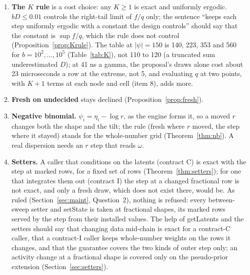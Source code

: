 \begin{enumerate}
\begin{itemize}
design's binomial and negative binomial cells lie (the scripts' counts give about 250 to 400); if it fails, the step
has no case at whole-number shapes, and S1 goes back to the maintainer before S2. Fractional shapes have no sum to
fall back on and keep the route whatever it costs: no inexact fallback is introduced. If $c_R$ there exceeds a
budget of ten times the design's figure, 70\,$\mu$s a row step, S1 reports the cells that exceed it (in the
scripts: $|\psi|\ge50$) for the documentation of real weights.
\end{itemize}
\item \textbf{The $K$ rule} is a cost choice: any $K\ge1$ is exact and uniformly ergodic. $bD\le0.01$ controls
the right-tail limit of $f/q$ only; the sentence ``keeps each step uniformly ergodic with a constant the design
controls'' should say that the constant is $\sup f/q$, which the rule does not control
(Proposition~\ref{prop:Krule}). The table at $|\psi|=150$ is 140, 223, 353 and 560 for $b=10^2,\dots,10^5$
(Table~\ref{tab:K}), not 110 to 120 (a truncated sum underestimated $D$); at 41 ns a gamma, the proposal's draws
alone cost about 23 microseconds a row at the extreme, not 5, and evaluating $q$ at two points, with $K+1$
terms at each node and cell (item 8), adds more.
\item \textbf{Fresh on undecided} stays declined (Proposition~\ref{prop:fresh}).
\item \textbf{Negative binomial.} $\psi_i=\eta_i-\log r$, as the engine forms it, so a moved $r$ changes both the
shape and the tilt; the rule (fresh where $r$ moved, the step where it stayed) stands for the whole-number grid
(Theorem~\ref{thm:nb}). A real dispersion needs an $r$ step that reads $\omega$.
\item \textbf{Setters.} A caller that conditions on the latents (contract C) is exact with the step at marked
rows, for a fixed set of rows (Theorem~\ref{thm:setters}); for one that integrates them out (contract I) the step
at a changed fractional row is not exact, and only a fresh draw, which does not exist there, would be. As ruled
(Section~\ref{sec:maint}, Question~2), nothing is refused: every between-sweep setter and setState is taken at
fractional shapes, its marked rows served by the step from their installed values. The help of getLatents and the
setters should say that changing data mid-chain is exact for a contract-C caller, that a contract-I caller keeps
whole-number weights on the rows it changes, and that the guarantee covers the two kinds of outer step only; an
activity change at a fractional shape is covered only on the pseudo-prior extension (Section~\ref{sec:setters}).

\end{enumerate}

